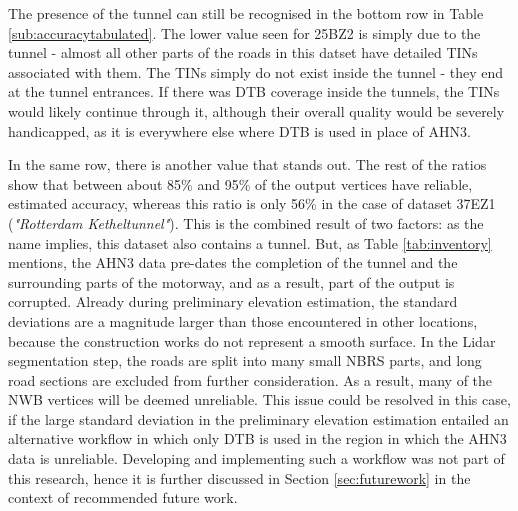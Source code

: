 The presence of the tunnel can still be recognised in the bottom row in Table \ref{sub:accuracytabulated}. The lower value seen for 25BZ2 is simply due to the tunnel - almost all other parts of the roads in this datset have detailed TINs associated with them. The TINs simply do not exist inside the tunnel - they end at the tunnel entrances. If there was DTB coverage inside the tunnels, the TINs would likely continue through it, although their overall quality would be severely handicapped, as it is everywhere else where DTB is used in place of AHN3.

In the same row, there is another value that stands out. The rest of the ratios show that between about 85\% and 95\% of the output vertices have reliable, estimated accuracy, whereas this ratio is only 56\% in the case of dataset 37EZ1 (\textit{"Rotterdam Ketheltunnel"}). This is the combined result of two factors: as the name implies, this dataset also contains a tunnel. But, as Table \ref{tab:inventory} mentions, the AHN3 data pre-dates the completion of the tunnel and the surrounding parts of the motorway, and as a result, part of the output is corrupted. Already during preliminary elevation estimation, the standard deviations are a magnitude larger than those encountered in other locations, because the construction works do not represent a smooth surface. In the Lidar segmentation step, the roads are split into many small NBRS parts, and long road sections are excluded from further consideration. As a result, many of the NWB vertices will be deemed unreliable. This issue could be resolved in this case, if the large standard deviation in the preliminary elevation estimation entailed an alternative workflow in which only DTB is used in the region in which the AHN3 data is unreliable. Developing and implementing such a workflow was not part of this research, hence it is further discussed in Section \ref{sec:futurework} in the context of recommended future work.

